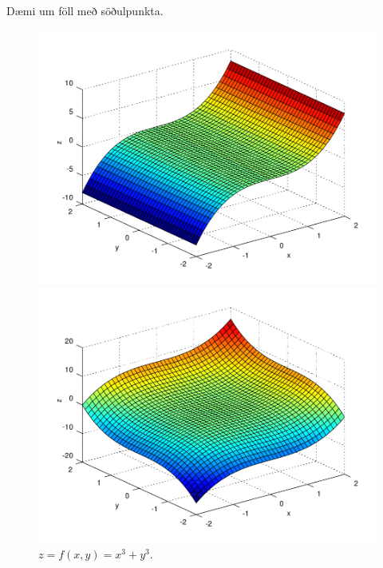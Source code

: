 \subsection{}
Dæmi um föll með söðulpunkta.
   \begin{figure}[!h]
        \centering
        \begin{minipage}{.5\textwidth}
            \centering
            \includegraphics[width=.9\linewidth]{sodull1.png}
            \caption*{$z = f(x,y) = x^3$.}
        \end{minipage}%
        \begin{minipage}{.5\textwidth}
            \centering
            \includegraphics[width=.9\linewidth]{sodull2.png}
            \caption*{$z = f(x,y) = x^3+y^3$.}
        \end{minipage}
        
    \end{figure}



